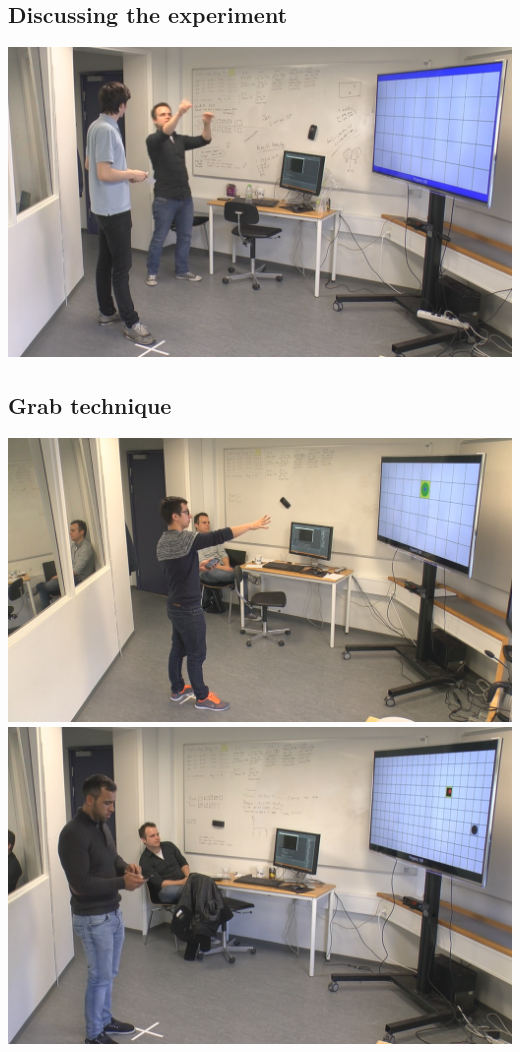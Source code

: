 \subsection*{Discussing the experiment}
\includegraphics[width=\textwidth]{files/discussion.png}

\subsection*{Grab technique}
\includegraphics[width=\textwidth]{files/grab_push.png}
\includegraphics[width=\textwidth]{files/grab_pull.png}

